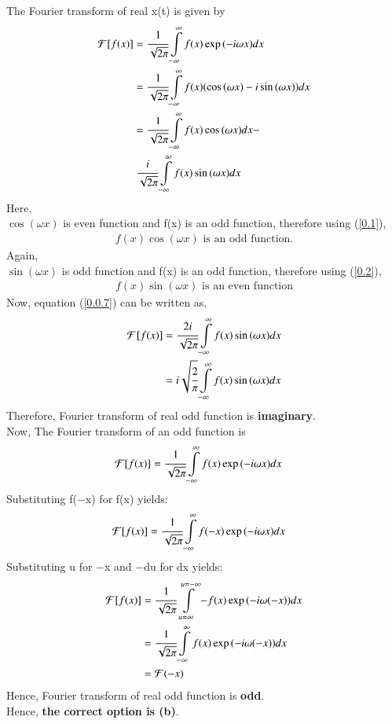 \documentclass[journal,12pt,twocolumn]{IEEEtran}
\begin{document}
The Fourier transform of real x(t) is given by
\begin{align}
    \mathcal{F}[f(x)] &= \cfrac{1}{\sqrt{2\pi}}\displaystyle\int\limits_{-\infty}^{\infty} f(x)\exp{(-i\omega x)}dx\\
    &= \cfrac{1}{\sqrt{2\pi}}\displaystyle\int\limits_{-\infty}^{\infty} f(x)(\cos{(\omega x)} - i\sin{(\omega x)})dx\\
    &= \cfrac{1}{\sqrt{2\pi}}\displaystyle\int\limits_{-\infty}^{\infty} f(x)\cos{(\omega x)}dx -\nonumber \\ 
    &\text{ }\cfrac{i}{\sqrt{2\pi}}\displaystyle\int\limits_{-\infty}^{\infty} f(x)\sin{(\omega x)}dx \label{0.0.7}
\end{align}
Here, \\
$\cos{(\omega x)}$ is even function and f(x) is an odd function, therefore using (\ref{0.1}),
\begin{align}
    f(x)\cos{(\omega x)} \text{ is an odd function.}
\end{align}
Again,\\
$\sin{(\omega x)}$ is odd function and f(x) is an odd function, therefore using (\ref{0.2}),
\begin{align}
   f(x)\sin{(\omega x)} \text{ is an even function} 
\end{align}
Now, equation (\ref{0.0.7}) can be written as,
\begin{align}
    \mathcal{F}[f(x)] &= \cfrac{2i}{\sqrt{2\pi}}\displaystyle\int\limits_{-\infty}^{\infty} f(x)\sin{(\omega x)}dx\\
    &= i\sqrt{\cfrac{2}{\pi}}\displaystyle\int\limits_{-\infty}^{\infty} f(x)\sin{(\omega x)}dx
\end{align}
Therefore, Fourier transform of real odd function is \textbf{imaginary}.\\

Now,
The Fourier transform of an odd function is
\begin{align}
    \mathcal{F}[f(x)] &= \cfrac{1}{\sqrt{2\pi}}\displaystyle\int\limits_{-\infty}^{\infty} f(x)\exp{(-i\omega x)}dx
\end{align}
Substituting f(−x) for f(x) yields:
\begin{align}
    \mathcal{F}[f(x)] &= \cfrac{1}{\sqrt{2\pi}}\displaystyle\int\limits_{-\infty}^{\infty} f(-x)\exp{(-i\omega x)}dx    
\end{align}
Substituting u for −x and −du for dx yields:
\begin{align}
    \mathcal{F}[f(x)] &= \cfrac{1}{\sqrt{2\pi}}\displaystyle\int\limits_{u=\infty}^{u=-\infty} -f(x)\exp{(-i\omega (-x))}dx\\
    &= \cfrac{1}{\sqrt{2\pi}}\displaystyle\int\limits_{-\infty}^{\infty} f(x)\exp{(-i\omega (-x))}dx\\
    &= \mathcal{F}(-x)
\end{align}
Hence,  Fourier transform of real odd function is \textbf{odd}.\\
Hence, \textbf{the correct option is (b)}.
\end{document}
